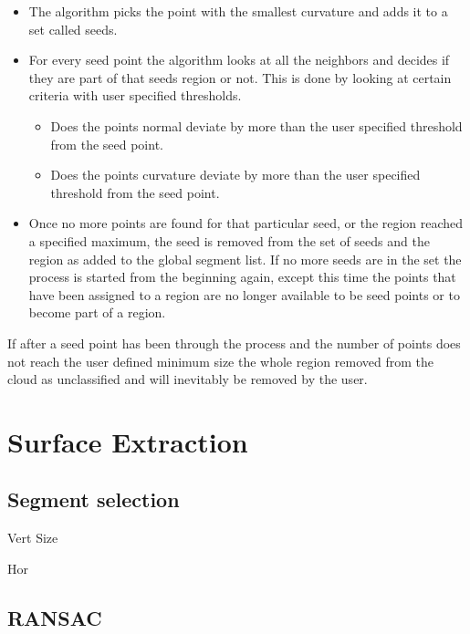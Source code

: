 		\begin{itemize}
			\item The algorithm picks the point with the smallest curvature and adds it to a set called seeds.
			
			\item For every seed point the algorithm looks at all the neighbors and decides if they are part of that seeds region or not. This is done by looking at certain criteria with user specified thresholds.
			
			\begin{itemize}
				\item Does the points normal deviate by more than the user specified threshold from the seed point.
				
				\item Does the points curvature deviate by more than the user specified threshold from the seed point.
				
			\end{itemize}
			
			\item Once no more points are found for that particular seed, or the region reached a specified maximum, the seed is removed from the set of seeds and the region as added to the global segment list. If no more seeds are in the set the process is started from the beginning again, except this time the points that have been assigned to a region are no longer available to be seed points or to become part of a region.
			
		\end{itemize}
		
		If after a seed point has been through the process and the number of points does not reach the user defined minimum size the whole region removed from the cloud as unclassified and will inevitably be removed by the user.
		
	


\section{Surface Extraction}
		
		\subsection{Segment selection}
			Vert
			Size
			
			Hor

		\subsection{RANSAC}


